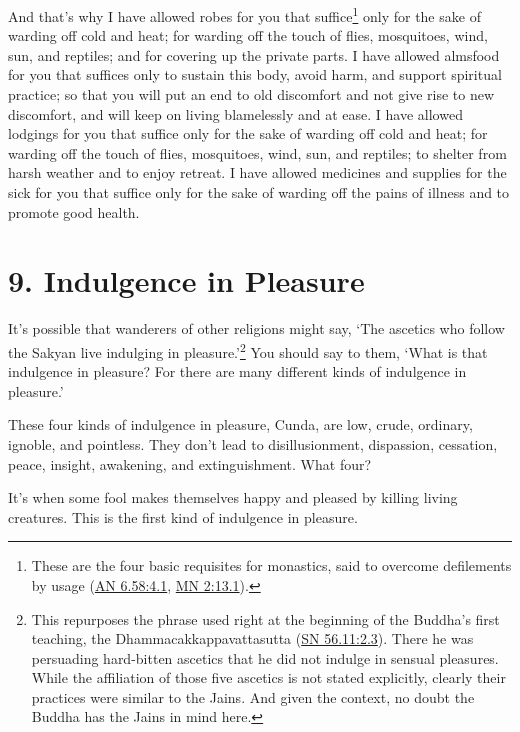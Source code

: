 \documentclass[12pt,openany]{book}%
\begin{document}
And that’s why I have allowed robes for you that suffice\footnote{These are the four basic requisites for monastics, said to overcome defilements by usage (\href{https://suttacentral.net/an6.58/en/sujato\#4.1}{AN 6.58:4.1}, \href{https://suttacentral.net/mn2/en/sujato\#13.1}{MN 2:13.1}). } only for the sake of warding off cold and heat; for warding off the touch of flies, mosquitoes, wind, sun, and reptiles; and for covering up the private parts. I have allowed almsfood for you that suffices only to sustain this body, avoid harm, and support spiritual practice; so that you will put an end to old discomfort and not give rise to new discomfort, and will keep on living blamelessly and at ease. I have allowed lodgings for you that suffice only for the sake of warding off cold and heat; for warding off the touch of flies, mosquitoes, wind, sun, and reptiles; to shelter from harsh weather and to enjoy retreat. I have allowed medicines and supplies for the sick for you that suffice only for the sake of warding off the pains of illness and to promote good health. 

\section*{9. Indulgence in Pleasure }

It’s possible that wanderers of other religions might say, ‘The ascetics who follow the Sakyan live indulging in pleasure.’\footnote{This repurposes the phrase used right at the beginning of the Buddha’s first teaching, the Dhammacakkappavattasutta (\href{https://suttacentral.net/sn56.11/en/sujato\#2.3}{SN 56.11:2.3}). There he was persuading hard-bitten ascetics that he did not indulge in sensual pleasures. While the affiliation of those five ascetics is not stated explicitly, clearly their practices were similar to the Jains. And given the context, no doubt the Buddha has the Jains in mind here. } You should say to them, ‘What is that indulgence in pleasure? For there are many different kinds of indulgence in pleasure.’ 

These four kinds of indulgence in pleasure, Cunda, are low, crude, ordinary, ignoble, and pointless. They don’t lead to disillusionment, dispassion, cessation, peace, insight, awakening, and extinguishment. What four? 

It’s when some fool makes themselves happy and pleased by killing living creatures. This is the first kind of indulgence in pleasure. 
\end{document}
